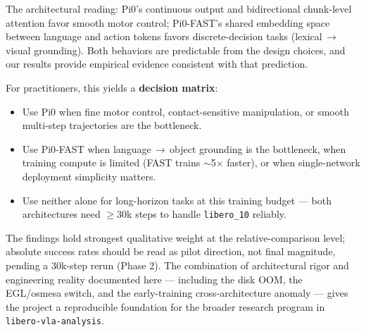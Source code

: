 \documentclass[11pt,letterpaper]{article}
\begin{document}
The architectural reading: Pi0's continuous output and bidirectional chunk-level attention favor smooth motor control; Pi0-FAST's shared embedding space between language and action tokens favors discrete-decision tasks (lexical\,$\to$\,visual grounding). Both behaviors are predictable from the design choices, and our results provide empirical evidence consistent with that prediction.

For practitioners, this yields a \textbf{decision matrix}:
\begin{itemize}[noitemsep,topsep=2pt]
  \item Use Pi0 when fine motor control, contact-sensitive manipulation, or smooth multi-step trajectories are the bottleneck.
  \item Use Pi0-FAST when language\,$\to$\,object grounding is the bottleneck, when training compute is limited (FAST trains $\sim$5$\times$ faster), or when single-network deployment simplicity matters.
  \item Use neither alone for long-horizon tasks at this training budget --- both architectures need $\geq$30k steps to handle \texttt{libero\_10} reliably.
\end{itemize}

The findings hold strongest qualitative weight at the relative-comparison level; absolute success rates should be read as pilot direction, not final magnitude, pending a 30k-step rerun (Phase 2). The combination of architectural rigor and engineering reality documented here --- including the disk OOM, the EGL/osmesa switch, and the early-training cross-architecture anomaly --- gives the project a reproducible foundation for the broader research program in \texttt{libero-vla-analysis}.
\end{document}

